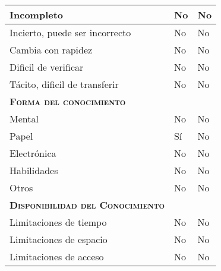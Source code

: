 \begin{table}[H]
{\begin{tabular}{|l|l|l|}
		Incompleto & \multicolumn{1}{p{1.0cm}|}{No} & \multicolumn{1}{p{13.0cm}|}{No}\\
		\hline

		Incierto, puede ser incorrecto & \multicolumn{1}{p{1.0cm}|}{No} & \multicolumn{1}{p{13.0cm}|}{No}\\
		\hline

		Cambia con rapidez & \multicolumn{1}{p{1.0cm}|}{No} & \multicolumn{1}{p{13.0cm}|}{No}\\
		\hline

		Dificil de verificar & \multicolumn{1}{p{1.0cm}|}{No} & \multicolumn{1}{p{13.0cm}|}{No}\\
		\hline

		Tácito, dificil de transferir& \multicolumn{1}{p{1.0cm}|}{No} & \multicolumn{1}{p{13.0cm}|}{No}\\
		\hline

		\textsc {\textbf{Forma del conocimiento}}& \multicolumn{1}{p{1.0cm}|}{} & \multicolumn{1}{p{13.0cm}|}{}\\
		\hline

		Mental & \multicolumn{1}{p{1.0cm}|}{No} & \multicolumn{1}{p{13.0cm}|}{No}\\
		\hline

		Papel & \multicolumn{1}{p{1.0cm}|}{Sí} & \multicolumn{1}{p{13.0cm}|}{No}\\
		\hline

		Electrónica & \multicolumn{1}{p{1.0cm}|}{No} & \multicolumn{1}{p{13.0cm}|}{No}\\
		\hline

		Habilidades & \multicolumn{1}{p{1.0cm}|}{No} & \multicolumn{1}{p{13.0cm}|}{No}\\
		\hline

		Otros & \multicolumn{1}{p{1.0cm}|}{No} & \multicolumn{1}{p{13.0cm}|}{No}\\
		\hline

		\textsc {\textbf{Disponibilidad del Conocimiento}} & \multicolumn{1}{p{1.0cm}|}{} & \multicolumn{1}{p{13.0cm}|}{}\\
		\hline
		Limitaciones de tiempo& \multicolumn{1}{p{1.0cm}|}{No} & \multicolumn{1}{p{13.0cm}|}{No}\\
		\hline

		Limitaciones de espacio& \multicolumn{1}{p{1.0cm}|}{No} & \multicolumn{1}{p{13.0cm}|}{No}\\
		\hline

		Limitaciones de acceso& \multicolumn{1}{p{1.0cm}|}{No} & \multicolumn{1}{p{13.0cm}|}{No}\\
		\hline


\end{tabular}}
\end{table}
